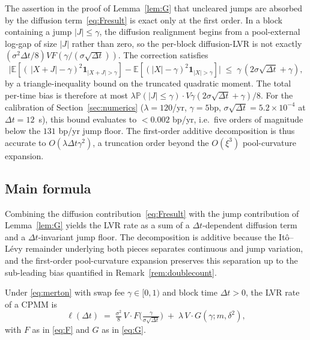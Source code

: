 \documentclass[runningheads]{llncs}
\newcommand{\E}{\mathbb{E}}
\newcommand{\Prob}{\mathbb{P}}
\newcommand{\dt}{\Delta t}
\newcommand{\1}{\mathbf{1}}
\begin{document}
\begin{remark}\label{rem:doublecount}
The assertion in the proof of Lemma~\ref{lem:G} that uncleared jumps are absorbed by the diffusion term~\eqref{eq:Fresult} is exact only at the first order. In a block containing a jump $|J| \leq \gamma$, the diffusion realignment begins from a pool-external log-gap of size $|J|$ rather than zero, so the per-block diffusion-LVR is not exactly $(\sigma^2\dt/8) V F(\gamma/(\sigma\sqrt{\dt}))$. The correction satisfies
\[
\big|\E[(\,|X+J|-\gamma)^2 \1_{|X+J|>\gamma}] - \E[(|X|-\gamma)^2 \1_{|X|>\gamma}]\big| \;\leq\; \gamma\,(2\sigma\sqrt{\dt}+\gamma),
\]
by a triangle-inequality bound on the truncated quadratic moment. The total per-time bias is therefore at most $\lambda \Prob(|J| \leq \gamma)\cdot V\gamma(2\sigma\sqrt{\dt}+\gamma)/8$. For the calibration of Section~\ref{sec:numerics} ($\lambda = 120$/yr, $\gamma = 5$bp, $\sigma\sqrt{\dt} = 5.2\times 10^{-4}$ at $\dt = 12$~s), this bound evaluates to $<\!0.002$ bp/yr, i.e.\ five orders of magnitude below the $131$ bp/yr jump floor. The first-order additive decomposition is thus accurate to $O(\lambda\dt\gamma^2)$, a truncation order beyond the $O(\xi^3)$ pool-curvature expansion.
\end{remark}

\subsection{Main formula}

Combining the diffusion contribution~\eqref{eq:Fresult} with the jump contribution of Lemma~\ref{lem:G} yields the LVR rate as a sum of a $\dt$-dependent diffusion term and a $\dt$-invariant jump floor. The decomposition is additive because the It\^o--L\'evy remainder underlying both pieces separates continuous and jump variation, and the first-order pool-curvature expansion preserves this separation up to the sub-leading bias quantified in Remark~\ref{rem:doublecount}.

\begin{theorem}\label{thm:fee}
Under \eqref{eq:merton} with swap fee $\gamma \in [0,1)$ and block time $\dt > 0$, the LVR rate of a CPMM is
\begin{equation}\label{eq:main}
\boxed{\;\ell(\dt) \;=\; \tfrac{\sigma^2}{8}\,V \cdot F\!\Big(\tfrac{\gamma}{\sigma\sqrt{\dt}}\Big) \;+\; \lambda \, V \cdot G(\gamma; m, \delta^2),\;}
\end{equation}
with $F$ as in \eqref{eq:F} and $G$ as in \eqref{eq:G}.
\end{theorem}
\end{document}
